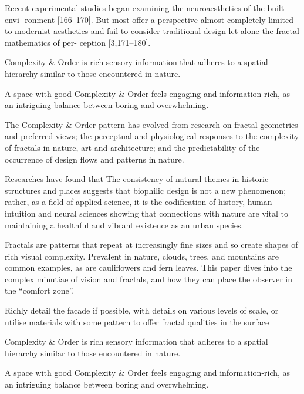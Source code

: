 Recent experimental studies began examining the neuroaesthetics of the built envi-
ronment [166–170]. But most offer a perspective almost completely limited to modernist
aesthetics and fail to consider traditional design let alone the fractal mathematics of per-
ception [3,171–180]. \cite{Brielmann2022}


Complexity & Order is rich sensory information that adheres to a spatial hierarchy similar to those encountered in nature. \cite{Browning2014}

A space with good Complexity & Order feels engaging and information-rich, as an intriguing balance between boring and overwhelming.\cite{Browning2014}

The Complexity & Order pattern has evolved from research on fractal geometries and preferred views; the perceptual and physiological responses to the complexity of fractals in nature, art and architecture; and the predictability of the occurrence of design flows and patterns in nature.\cite{Browning2014}




Researches have found that
The consistency of natural themes in historic structures and places suggests that
biophilic design is not a new phenomenon; rather, as a field of applied science,
it is the codification of history, human intuition and neural sciences showing that
connections with nature are vital to maintaining a healthful and vibrant existence
as an urban species.\cite{Browning2014}

Fractals are patterns that repeat at increasingly fine sizes and so create shapes of rich visual complexity.
Prevalent in nature, clouds, trees, and mountains are common examples, as are cauliﬂowers and fern leaves.
This paper dives into the complex minutiae of vision and fractals, and how they can place the observer in the “comfort zone”.\cite{Browning2014}

Richly detail the facade if possible, with details on various levels of scale, or utilise materials with some pattern to offer fractal qualities in the surface\cite{Aesthetic2022}

Complexity & Order is rich sensory information that adheres to a spatial hierarchy similar to those encountered in nature. \cite{Browning2014}

A space with good Complexity & Order feels engaging and information-rich, as an intriguing balance between boring and overwhelming.\cite{Browning2014}

